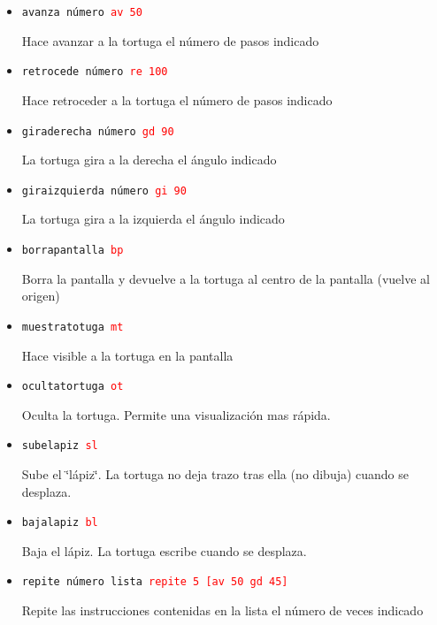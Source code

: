 \documentclass[12pt,twoside,spanish,a4paper]{report}
\begin{document}
\begin{itemize}
   \item \texttt{avanza n\'umero\hspace{3.8cm} \textcolor{red}{av 50}}

      Hace avanzar a la tortuga el n\'umero de pasos indicado
   \item \texttt{retrocede n\'umero\hspace{3.3cm} \textcolor{red}{re 100}}

      Hace retroceder a la tortuga el n\'umero de pasos indicado
   \item \texttt{giraderecha n\'umero\hspace{2.9cm} \textcolor{red}{gd 90}}

      La tortuga gira a la derecha el \'angulo indicado
   \item \texttt{giraizquierda n\'umero\hspace{2.7cm} \textcolor{red}{gi 90}}

      La tortuga gira a la izquierda el \'angulo indicado
   \item \texttt{borrapantalla \hspace{4cm} \textcolor{red}{bp}}

      Borra la pantalla y devuelve a la tortuga al centro de la pantalla
      (vuelve al origen)
   \item \texttt{muestratotuga \hspace{4.1cm} \textcolor{red}{mt}}

      Hace visible a la tortuga en la pantalla
   \item \texttt{ocultatortuga \hspace{4.1cm} \textcolor{red}{ot}}

      Oculta la tortuga. Permite una visualizaci\'on mas r\'apida.
   \item \texttt{subelapiz \hspace{5.0cm} \textcolor{red}{sl}}

      Sube el \char`\"{}l\'apiz\char`\"{}. La tortuga no deja trazo tras
      ella (no dibuja) cuando se desplaza.
   \item \texttt{bajalapiz \hspace{5.0cm} \textcolor{red}{bl}}

      Baja el l\'apiz. La tortuga escribe cuando se desplaza.
   \item \texttt{repite n\'umero lista \hspace{2.7cm}
      \textcolor{red}{repite 5 [av 50 gd 45]}}

      Repite las instrucciones contenidas en la lista el n\'umero de veces
      indicado
\end{itemize}
\end{document}

